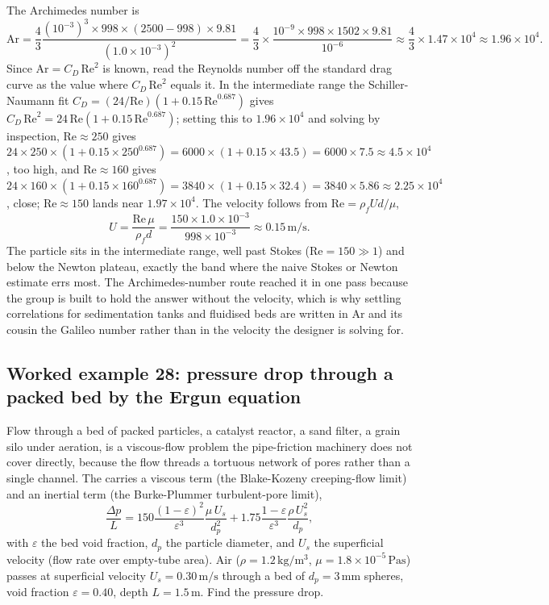 The Archimedes number is
\[
\text{Ar} = \frac{4}{3}\frac{(10^{-3})^3\times998\times(2500-998)
\times9.81}{(1.0\times10^{-3})^2} = \frac{4}{3}\times\frac{10^{-9}
\times998\times1502\times9.81}{10^{-6}} \approx \frac{4}{3}\times
1.47\times10^{4} \approx 1.96\times10^{4}.
\]
Since $\text{Ar} = C_D\,\text{Re}^2$ is known, read the Reynolds number
off the standard drag curve as the value where $C_D\,\text{Re}^2$
equals it. In the intermediate range the Schiller-Naumann fit
$C_D = (24/\text{Re})(1 + 0.15\,\text{Re}^{0.687})$ gives $C_D\,
\text{Re}^2 = 24\,\text{Re}(1 + 0.15\,\text{Re}^{0.687})$; setting this
to $1.96\times10^{4}$ and solving by inspection, $\text{Re}\approx250$
gives $24\times250\times(1 + 0.15\times250^{0.687}) = 6000\times(1 +
0.15\times43.5) = 6000\times7.5 \approx 4.5\times10^{4}$, too high, and
$\text{Re}\approx160$ gives $24\times160\times(1 + 0.15\times160^{0.687})
= 3840\times(1 + 0.15\times32.4) = 3840\times5.86 \approx 2.25\times
10^{4}$, close; $\text{Re}\approx150$ lands near $1.97\times10^{4}$. The
velocity follows from $\text{Re} = \rho_f U d/\mu$,
\[
U = \frac{\text{Re}\,\mu}{\rho_f d} = \frac{150\times1.0\times10^{-3}}{
998\times10^{-3}} \approx 0.15\,\si{\meter\per\second}.
\]
The particle sits in the intermediate range, well past Stokes
($\text{Re} = 150 \gg 1$) and below the Newton plateau, exactly the
band where the naive Stokes or Newton estimate errs most. The
Archimedes-number route reached it in one pass because the group is
built to hold the answer without the velocity, which is why settling
correlations for sedimentation tanks and fluidised beds are written in
$\text{Ar}$ and its cousin the Galileo number rather than in the
velocity the designer is solving for.

\subsection*{Worked example 28: pressure drop through a packed bed by the Ergun equation}

Flow through a bed of packed particles, a catalyst reactor, a sand
filter, a grain silo under aeration, is a viscous-flow problem the
pipe-friction machinery does not cover directly, because the flow
threads a tortuous network of pores rather than a single channel. The
 carries a viscous term (the Blake-Kozeny
creeping-flow limit) and an inertial term (the Burke-Plummer
turbulent-pore limit),
\[
\frac{\Delta p}{L} = 150\frac{(1-\varepsilon)^2}{\varepsilon^3}
\frac{\mu\,U_s}{d_p^2} + 1.75\frac{1-\varepsilon}{\varepsilon^3}
\frac{\rho\,U_s^2}{d_p},
\]
with $\varepsilon$ the bed void fraction, $d_p$ the particle diameter,
and $U_s$ the superficial velocity (flow rate over empty-tube area).
Air ($\rho = 1.2\,\si{\kilogram\per\meter\cubed}$, $\mu = 1.8\times
10^{-5}\,\si{\pascal\second}$) passes at superficial velocity $U_s =
0.30\,\si{\meter\per\second}$ through a bed of $d_p = 3\,\si{\milli
\meter}$ spheres, void fraction $\varepsilon = 0.40$, depth $L = 1.5\,
\si{\meter}$. Find the pressure drop.

